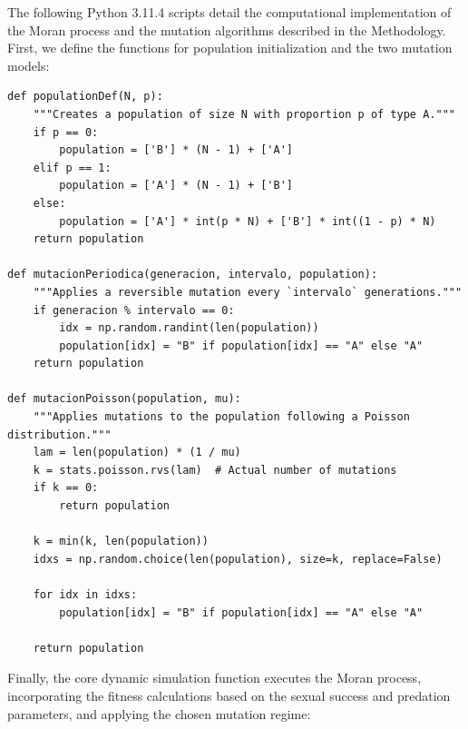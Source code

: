 The following Python 3.11.4 scripts detail the computational implementation of the Moran process and the mutation algorithms described in the Methodology. First, we define the functions for population initialization and the two mutation models:

\begin{verbatim}
def populationDef(N, p):
    """Creates a population of size N with proportion p of type A."""
    if p == 0: 
        population = ['B'] * (N - 1) + ['A']
    elif p == 1:
        population = ['A'] * (N - 1) + ['B']
    else:
        population = ['A'] * int(p * N) + ['B'] * int((1 - p) * N)
    return population

def mutacionPeriodica(generacion, intervalo, population):
    """Applies a reversible mutation every `intervalo` generations."""
    if generacion % intervalo == 0:
        idx = np.random.randint(len(population))
        population[idx] = "B" if population[idx] == "A" else "A"
    return population
    
def mutacionPoisson(population, mu):
    """Applies mutations to the population following a Poisson distribution."""
    lam = len(population) * (1 / mu)                      
    k = stats.poisson.rvs(lam)  # Actual number of mutations
    if k == 0:
        return population
        
    k = min(k, len(population))                   
    idxs = np.random.choice(len(population), size=k, replace=False)

    for idx in idxs:
        population[idx] = "B" if population[idx] == "A" else "A"
    
    return population
\end{verbatim}

Finally, the core dynamic simulation function executes the Moran process, incorporating the fitness calculations based on the sexual success and predation parameters, and applying the chosen mutation regime:


